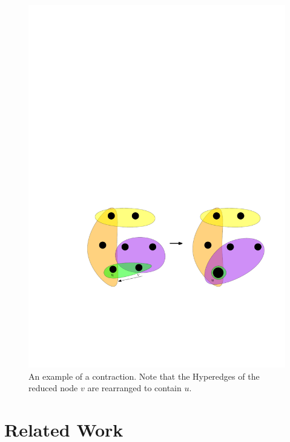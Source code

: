 \documentclass[a4paper,12pt,titlepage, BCOR7mm,headsepline]{scrbook}
\numberwithin{equation}{section}
\begin{document}
\begin{figure}[t!] 
    \vspace*{-.25cm}
  \centering
   \includegraphics[width=.8\textwidth]{Ipe/Coarsening_Example.pdf}
  \caption{An example of a contraction. Note that the Hyperedges of the reduced node $v$ are rearranged to contain $u$.}\label{fig:coarsening_example}
    \vspace*{-.5cm}
\end{figure}



\section{Related Work}

\end{document}

